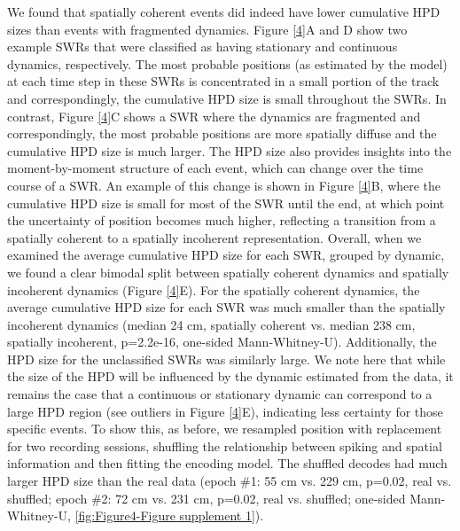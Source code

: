 \documentclass[times, twoside]{zHenriquesLab-StyleBioRxiv}
\begin{document}
We found that spatially coherent events did indeed have lower cumulative HPD sizes than events with fragmented dynamics. Figure \ref{4}A and D show two example SWRs that were classified as having stationary and continuous dynamics, respectively. The most probable positions (as estimated by the model) at each time step in these SWRs is concentrated in a small portion of the track and correspondingly, the cumulative HPD size is small throughout the SWRs. In contrast, Figure \ref{4}C shows a SWR where the dynamics are fragmented and correspondingly, the most probable positions are more spatially diffuse and the cumulative HPD size is much larger. The HPD size also provides insights into the moment-by-moment structure of each event, which can change over the time course of a SWR. An example of this change is shown in Figure \ref{4}B, where the cumulative HPD size is small for most of the SWR until the end, at which point the uncertainty of position becomes much higher, reflecting a transition from a spatially coherent to a spatially incoherent representation. Overall, when we examined the average cumulative HPD size for each SWR, grouped by dynamic, we found a clear bimodal split between spatially coherent dynamics and spatially incoherent dynamics (Figure \ref{4}E). For the spatially coherent dynamics, the average cumulative HPD size for each SWR was much smaller than the spatially incoherent dynamics (median 24 cm, spatially coherent vs. median 238 cm, spatially incoherent, p=2.2e-16, one-sided Mann-Whitney-U). Additionally, the HPD size for the unclassified SWRs was similarly large. We note here that while the size of the HPD will be influenced by the dynamic estimated from the data, it remains the case that a continuous or stationary dynamic can correspond to a large HPD region (see outliers in Figure \ref{4}E), indicating less certainty for those specific events.  To show this, as before, we resampled position with replacement for two recording sessions, shuffling the relationship between spiking and spatial information and then fitting the encoding model. The shuffled decodes had much larger HPD size than the real data (epoch \#1: 55 cm vs. 229 cm, p=0.02, real vs. shuffled; epoch \#2: 72 cm vs. 231 cm, p=0.02, real vs. shuffled; one-sided Mann-Whitney-U, \ref{fig:Figure4-Figure supplement 1}).
\end{document}

